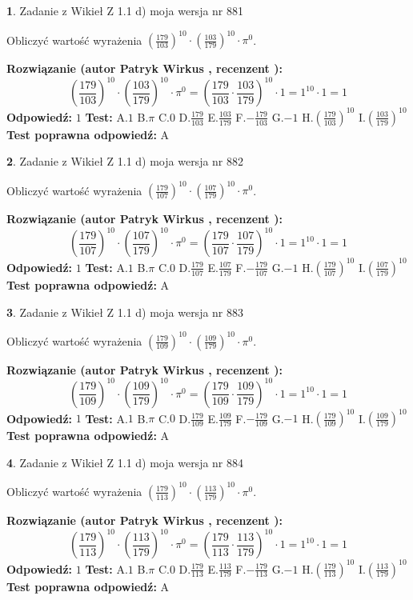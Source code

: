 \documentclass[12pt, a4paper]{article}
\theoremstyle{definition} %
\newtheorem{zad}{}
\newcommand{\zadStart}[1]{\begin{zad}#1\newline}
\newcommand{\zadStop}{\end{zad}}
\newcommand{\rozwStart}[2]{\noindent \textbf{Rozwiązanie (autor #1 , recenzent #2): }\newline}
\newcommand{\rozwStop}{\newline}
\newcommand{\odpStart}{\noindent \textbf{Odpowiedź:}\newline}
\newcommand{\odpStop}{\newline}
\newcommand{\testStart}{\noindent \textbf{Test:}\newline}
\newcommand{\testStop}{\newline}
\newcommand{\kluczStart}{\noindent \textbf{Test poprawna odpowiedź:}\newline}
\newcommand{\kluczStop}{\newline}
\begin{document}
\zadStart{Zadanie z Wikieł Z 1.1 d) moja wersja nr 881}

Obliczyć wartość wyrażenia $(\frac{179}{103})^{10} \cdot (\frac{103}{179})^{10} \cdot \pi^{0}$.
\zadStop
\rozwStart{Patryk Wirkus}{}
$$(\frac{179}{103})^{10} \cdot (\frac{103}{179})^{10} \cdot \pi^{0} = (\frac{179}{103} \cdot \frac{103}{179})^{10} \cdot 1 = 1^{10} \cdot 1 = 1$$
\rozwStop
\odpStart
$1$
\odpStop
\testStart
A.$1$ B.$\pi$ C.$0$ D.$\frac{179}{103}$ E.$\frac{103}{179}$
F.$-\frac{179}{103}$ G.$-1$
H.$(\frac{179}{103})^{10}$
I.$(\frac{103}{179})^{10}$
\testStop
\kluczStart
A
\kluczStop



\zadStart{Zadanie z Wikieł Z 1.1 d) moja wersja nr 882}

Obliczyć wartość wyrażenia $(\frac{179}{107})^{10} \cdot (\frac{107}{179})^{10} \cdot \pi^{0}$.
\zadStop
\rozwStart{Patryk Wirkus}{}
$$(\frac{179}{107})^{10} \cdot (\frac{107}{179})^{10} \cdot \pi^{0} = (\frac{179}{107} \cdot \frac{107}{179})^{10} \cdot 1 = 1^{10} \cdot 1 = 1$$
\rozwStop
\odpStart
$1$
\odpStop
\testStart
A.$1$ B.$\pi$ C.$0$ D.$\frac{179}{107}$ E.$\frac{107}{179}$
F.$-\frac{179}{107}$ G.$-1$
H.$(\frac{179}{107})^{10}$
I.$(\frac{107}{179})^{10}$
\testStop
\kluczStart
A
\kluczStop



\zadStart{Zadanie z Wikieł Z 1.1 d) moja wersja nr 883}

Obliczyć wartość wyrażenia $(\frac{179}{109})^{10} \cdot (\frac{109}{179})^{10} \cdot \pi^{0}$.
\zadStop
\rozwStart{Patryk Wirkus}{}
$$(\frac{179}{109})^{10} \cdot (\frac{109}{179})^{10} \cdot \pi^{0} = (\frac{179}{109} \cdot \frac{109}{179})^{10} \cdot 1 = 1^{10} \cdot 1 = 1$$
\rozwStop
\odpStart
$1$
\odpStop
\testStart
A.$1$ B.$\pi$ C.$0$ D.$\frac{179}{109}$ E.$\frac{109}{179}$
F.$-\frac{179}{109}$ G.$-1$
H.$(\frac{179}{109})^{10}$
I.$(\frac{109}{179})^{10}$
\testStop
\kluczStart
A
\kluczStop



\zadStart{Zadanie z Wikieł Z 1.1 d) moja wersja nr 884}

Obliczyć wartość wyrażenia $(\frac{179}{113})^{10} \cdot (\frac{113}{179})^{10} \cdot \pi^{0}$.
\zadStop
\rozwStart{Patryk Wirkus}{}
$$(\frac{179}{113})^{10} \cdot (\frac{113}{179})^{10} \cdot \pi^{0} = (\frac{179}{113} \cdot \frac{113}{179})^{10} \cdot 1 = 1^{10} \cdot 1 = 1$$
\rozwStop
\odpStart
$1$
\odpStop
\testStart
A.$1$ B.$\pi$ C.$0$ D.$\frac{179}{113}$ E.$\frac{113}{179}$
F.$-\frac{179}{113}$ G.$-1$
H.$(\frac{179}{113})^{10}$
I.$(\frac{113}{179})^{10}$
\testStop
\kluczStart
A
\kluczStop
\end{document}
